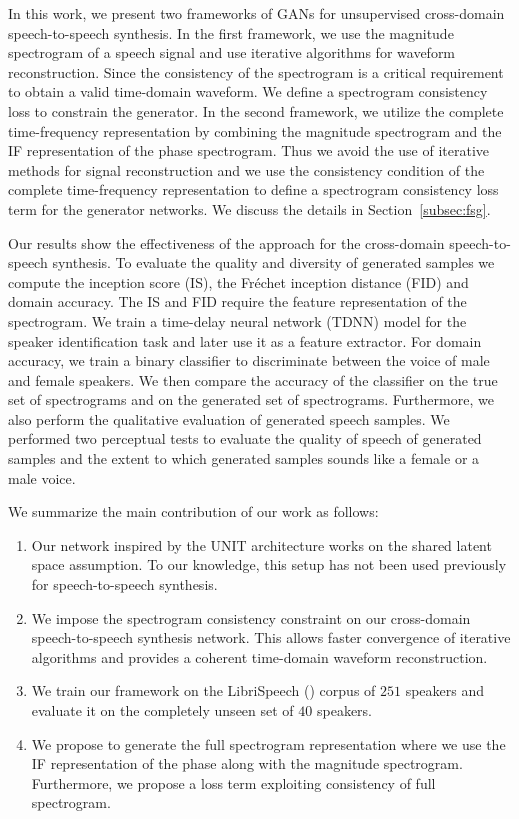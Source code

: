 In this work, we present two frameworks of GANs for unsupervised cross-domain speech-to-speech synthesis. In the first framework, we use the magnitude spectrogram of a speech signal and use iterative algorithms for waveform reconstruction. Since the consistency of the spectrogram is a critical requirement to obtain a valid time-domain waveform. We define a spectrogram consistency loss to constrain the generator. In the second framework, we utilize the complete time-frequency representation by combining the magnitude spectrogram and the IF representation of the phase spectrogram. Thus we avoid the use of iterative methods for signal reconstruction and we use the consistency condition of the complete time-frequency representation to define a spectrogram consistency loss term for the generator networks. We discuss the details in Section~\ref{subsec:fsg}.

Our results show the effectiveness of the approach for the cross-domain speech-to-speech synthesis. To evaluate the quality and diversity of generated samples we compute the inception score (IS), the Fr\'{e}chet inception distance (FID) and domain accuracy. The IS and FID require the feature representation of the spectrogram. We train a time-delay neural network (TDNN) model for the speaker identification task and later use it as a feature extractor.
For domain accuracy, we train a binary classifier to discriminate between the voice of male and female speakers. We then compare the accuracy of the classifier on the true set of spectrograms and on the generated set of spectrograms. Furthermore, we also perform the qualitative evaluation of generated speech samples. We performed two perceptual tests to evaluate the quality of speech of generated samples and the extent to which generated samples sounds like a female or a male voice. 

We summarize the main contribution of our work as follows:
\begin{enumerate}[label=(\roman*)]
\item Our network inspired by the UNIT architecture works on the shared latent space assumption. To our knowledge, this setup has not been used previously for speech-to-speech synthesis.

\item We impose the spectrogram consistency constraint on our cross-domain speech-to-speech synthesis network. This allows faster convergence of iterative algorithms and provides a coherent time-domain waveform reconstruction. 

\item We train our framework on the LibriSpeech (\cite{panayotov2015librispeech}) corpus of $251$ speakers and evaluate it on the completely unseen set of $40$ speakers.  

\item We propose to generate the full spectrogram representation where we use the IF representation of the phase along with the magnitude spectrogram. Furthermore, we propose a loss term exploiting consistency of full spectrogram.
\end{enumerate}


